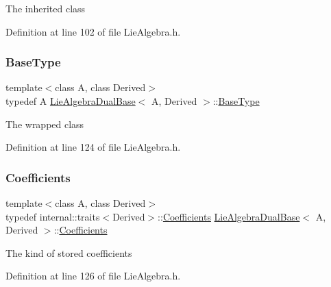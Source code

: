 The inherited class 

Definition at line 102 of file Lie\+Algebra.\+h.

\hypertarget{class_lie_algebra_dual_base_a1d0d10f7479bc0e235b13e29f1c012d2}{}\label{class_lie_algebra_dual_base_a1d0d10f7479bc0e235b13e29f1c012d2} 
\subsubsection{\texorpdfstring{Base\+Type}{BaseType}}
{\footnotesize\ttfamily template$<$class A, class Derived$>$ \\
typedef A \hyperlink{class_lie_algebra_dual_base}{Lie\+Algebra\+Dual\+Base}$<$ A, Derived $>$\+::\hyperlink{class_lie_algebra_dual_base_a1d0d10f7479bc0e235b13e29f1c012d2}{Base\+Type}}

The wrapped class 

Definition at line 124 of file Lie\+Algebra.\+h.

\hypertarget{class_lie_algebra_dual_base_a9cbdf57fdc61d9ff457e9a9a814f5fdd}{}\label{class_lie_algebra_dual_base_a9cbdf57fdc61d9ff457e9a9a814f5fdd} 
\subsubsection{\texorpdfstring{Coefficients}{Coefficients}}
{\footnotesize\ttfamily template$<$class A, class Derived$>$ \\
typedef internal\+::traits$<$Derived$>$\+::\hyperlink{class_lie_algebra_dual_base_a9cbdf57fdc61d9ff457e9a9a814f5fdd}{Coefficients} \hyperlink{class_lie_algebra_dual_base}{Lie\+Algebra\+Dual\+Base}$<$ A, Derived $>$\+::\hyperlink{class_lie_algebra_dual_base_a9cbdf57fdc61d9ff457e9a9a814f5fdd}{Coefficients}}

The kind of stored coefficients 

Definition at line 126 of file Lie\+Algebra.\+h.

\hypertarget{class_lie_algebra_dual_base_a540618e11addb56f20f6d007204c107c}{}\label{class_lie_algebra_dual_base_a540618e11addb56f20f6d007204c107c} 
